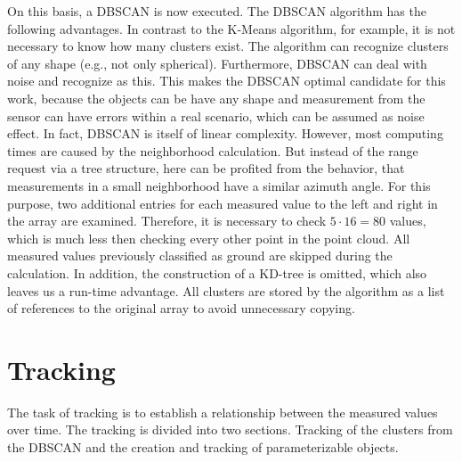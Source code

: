 \documentclass[11pt,oneside,openright]{mpreport}
\begin{document}
On this basis, a \ac{DBSCAN} \cite{DBSCAN} is now executed. The \ac{DBSCAN} algorithm has the following advantages. In contrast to the K-Means algorithm,
for example, it is not necessary to know how many clusters exist. The algorithm can recognize clusters of any shape (e.g., not only spherical).
Furthermore, \ac{DBSCAN} can deal with noise and recognize as this. This makes the \ac{DBSCAN} optimal candidate for this work, because the objects can be have any shape and 
measurement from the sensor can have errors within a real scenario, which can be assumed as noise effect. 
In fact, \ac{DBSCAN} is itself of linear complexity. However, most computing times are caused by the neighborhood calculation.
But instead of the range request via a tree structure, here can be profited from the behavior, that measurements in a small neighborhood have a similar azimuth angle.
For this purpose, two additional entries for each measured value to the left and right in the array are examined. 
Therefore, it is necessary to check $5 \cdot 16 = 80$ values, which is much less then checking every other point in the point cloud. %
All measured values previously classified as ground are skipped during the calculation. In addition, the construction of a KD-tree is omitted, which also leaves us a run-time advantage.
All clusters are stored by the algorithm as a list of references to the original array to avoid unnecessary copying.


\section{Tracking}
\label{tracking}
The task of tracking is to establish a relationship between the measured values over time. The tracking is divided into two sections.
Tracking of the clusters from the \ac{DBSCAN} and the creation and tracking of parameterizable objects.
\end{document}
